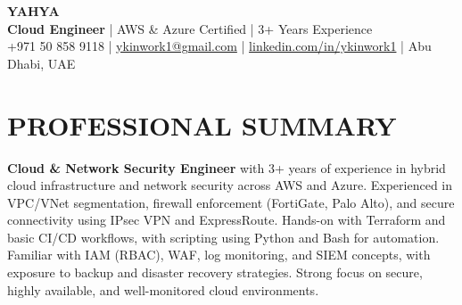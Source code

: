 \documentclass[10pt,a4paper]{article}
\begin{document}
\pagestyle{empty}
\color{textmain}

\noindent
\begin{minipage}[c]{0.75\textwidth}
    {\Huge \textbf{\color{textdark} YAHYA}}\\[0.1ex]
    \textbf{\color{teal} Cloud Engineer} | AWS \& Azure Certified | 3+ Years Experience\\[0.1ex]
    +971 50 858 9118 \quad|\quad 
    \href{mailto:ykinwork1@gmail.com}{ykinwork1@gmail.com} \quad|\quad 
    \href{https://linkedin.com/in/ykinwork1}{linkedin.com/in/ykinwork1} \quad|\quad 
    Abu Dhabi, UAE
\end{minipage}%
\hfill
\begin{minipage}[c]{0.2\textwidth}
    \raggedleft
\end{minipage}

\vspace{-2ex}
\section*{PROFESSIONAL SUMMARY}
\textbf{Cloud \& Network Security Engineer} with 3+ years of experience in hybrid cloud infrastructure and network security across AWS and Azure. Experienced in VPC/VNet segmentation, firewall enforcement (FortiGate, Palo Alto), and secure connectivity using IPsec VPN and ExpressRoute. Hands-on with Terraform and basic CI/CD workflows, with scripting using Python and Bash for automation. Familiar with IAM (RBAC), WAF, log monitoring, and SIEM concepts, with exposure to backup and disaster recovery strategies. Strong focus on secure, highly available, and well-monitored cloud environments.
\end{document}
